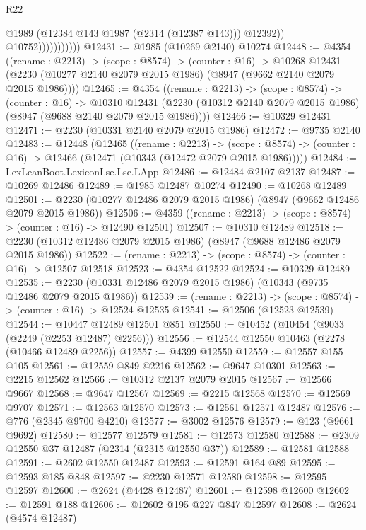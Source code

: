 \begin{lexlean}{R22}
\begin{coremodule}
                              @1989
                              (@12384 @143 @1987 (@2314 (@12387 @143)))
                              @12392))
                          @10752)))))))))))
@12431 := @1985 (@10269 @2140) @10274
@12448 := @4354
    ((rename : @2213) ->
    (scope : @8574) ->
    (counter : @16) ->
    @10268 @12431 (@2230 (@10277 @2140 @2079 @2015 @1986) (@8947 (@9662 @2140 @2079 @2015 @1986))))
@12465 := @4354
    ((rename : @2213) ->
    (scope : @8574) ->
    (counter : @16) ->
    @10310 @12431 (@2230 (@10312 @2140 @2079 @2015 @1986) (@8947 (@9688 @2140 @2079 @2015 @1986))))
@12466 := @10329 @12431
@12471 := @2230 (@10331 @2140 @2079 @2015 @1986)
@12472 := @9735 @2140
@12483 := @12448
    (@12465
      ((rename : @2213) ->
      (scope : @8574) -> (counter : @16) -> @12466 (@12471 (@10343 (@12472 @2079 @2015 @1986)))))
@12484 := LexLeanBoot.LexiconLse.Lse.LApp
@12486 := @12484 @2107 @2137
@12487 := @10269 @12486
@12489 := @1985 @12487 @10274
@12490 := @10268 @12489
@12501 := @2230 (@10277 @12486 @2079 @2015 @1986) (@8947 (@9662 @12486 @2079 @2015 @1986))
@12506 := @4359 ((rename : @2213) -> (scope : @8574) -> (counter : @16) -> @12490 @12501)
@12507 := @10310 @12489
@12518 := @2230 (@10312 @12486 @2079 @2015 @1986) (@8947 (@9688 @12486 @2079 @2015 @1986))
@12522 := (rename : @2213) -> (scope : @8574) -> (counter : @16) -> @12507 @12518
@12523 := @4354 @12522
@12524 := @10329 @12489
@12535 := @2230 (@10331 @12486 @2079 @2015 @1986) (@10343 (@9735 @12486 @2079 @2015 @1986))
@12539 := (rename : @2213) -> (scope : @8574) -> (counter : @16) -> @12524 @12535
@12541 := @12506 (@12523 @12539)
@12544 := @10447 @12489 @12501 @851
@12550 := @10452 (@10454 (@9033 (@2249 (@2253 @12487) @2256)))
@12556 := @12544 @12550 @10463 (@2278 (@10466 @12489 @2256))
@12557 := @4399 @12550
@12559 := @12557 @155 @105
@12561 := @12559 @849 @2216
@12562 := @9647 @10301
@12563 := @2215 @12562
@12566 := @10312 @2137 @2079 @2015
@12567 := @12566 @9667
@12568 := @9647 @12567
@12569 := @2215 @12568
@12570 := @12569 @9707
@12571 := @12563 @12570
@12573 := @12561 @12571 @12487
@12576 := @776 (@2345 @9700 @4210)
@12577 := @3002 @12576
@12579 := @123 (@9661 @9692)
@12580 := @12577 @12579
@12581 := @12573 @12580
@12588 := @2309 @12550 @37 @12487 (@2314 (@2315 @12550 @37))
@12589 := @12581 @12588
@12591 := @2602 @12550 @12487
@12593 := @12591 @164 @89
@12595 := @12593 @185 @848
@12597 := @2230 @12571 @12580
@12598 := @12595 @12597
@12600 := @2624 (@4428 @12487)
@12601 := @12598 @12600
@12602 := @12591 @188
@12606 := @12602 @195 @227 @847 @12597
@12608 := @2624 (@4574 @12487)

\end{coremodule}
\end{lexlean}
